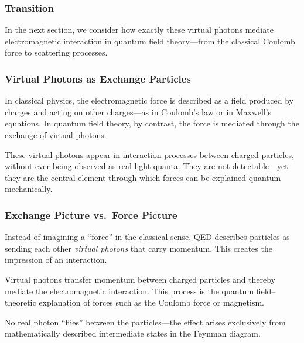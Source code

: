 \subsubsection*{Transition}

In the next section, we consider how exactly these virtual photons mediate electromagnetic interaction in quantum field theory—from the classical Coulomb force to scattering processes.

\subsubsection{Virtual Photons as Exchange Particles}

In classical physics, the electromagnetic force is described as a field produced by charges and acting on other charges—as in Coulomb’s law or in Maxwell’s equations. In quantum field theory, by contrast, the force is mediated through the exchange of virtual photons.

These virtual photons appear in interaction processes between charged particles, without ever being observed as real light quanta. They are not detectable—yet they are the central element through which forces can be explained quantum mechanically.

\subsubsection*{Exchange Picture vs.\ Force Picture}

Instead of imagining a “force” in the classical sense, QED describes particles as sending each other \emph{virtual photons} that carry momentum. This creates the impression of an interaction.

\vspace{1em}
\begin{tcolorbox}[physikbox, title=Virtual Photons as Force Mediators]
	\label{box:Virtuelle Photonen als kraftvermittler}
	Virtual photons transfer momentum between charged particles and thereby mediate the electromagnetic interaction. This process is the quantum field–theoretic explanation of forces such as the Coulomb force or magnetism.
	
	No real photon “flies” between the particles—the effect arises exclusively from mathematically described intermediate states in the Feynman diagram.
\end{tcolorbox}
\newpage
\noindent

